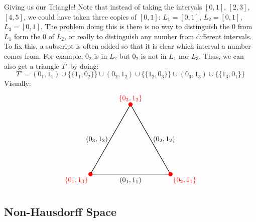 \documentclass{article}
\begin{document}
Giving us our Triangle! Note that instead of taking the intervals $[0,1]$, $[2,3]$, $[4,5]$, we could have
taken three copies of $[0,1]$: $L_1 = [0,1]$, $L_2  = [0,1]$, $L_3 = [0,1]$. The problem doing this is there is no way to distinguish the $0$ from
$L_1$ form the $0$ of $L_2$, or really to distinguish any number from different intervals. To fix this, a subscript
is often added so that it is clear which interval a number comes from. For example, $0_2$ is in $L_2$ but
$0_2$ is not in $L_1$ nor $L_3$. Thus, we can also get a triangle $T'$ by doing:
\[
  T' =(0_1,1_1) \cup \{\{1_1,0_2\}\}\cup (0_2,1_2)\cup \{\{1_2,0_3\}\}\cup (0_3,1_3)\cup \{\{1_3,0_1\}\}
\]
Visually:
\[
  \begin{tikzpicture}
  \coordinate (A) at (0,0);
  \coordinate (B) at (4,0);
  \coordinate (C) at (2,3.5);

  \draw[thick] (A) -- node[midway, below] {$(0_1,1_1)$} (B);
  \draw[thick] (B) -- node[midway, right] {$(0_2,1_2)$} (C);
  \draw[thick] (C) -- node[midway, left] {$(0_3,1_3)$} (A);

  \draw[red, fill=red] (A) circle (0.1) node[below left] {$\{0_1, 1_3\}$};
  \draw[red, fill=red] (B) circle (0.1) node[below right] {$\{0_2, 1_1\}$};
  \draw[red, fill=red] (C) circle (0.1) node[above] {$\{0_3, 1_2\}$};
\end{tikzpicture}
\]

\subsection*{Non-Hausdorff Space}
\end{document}
